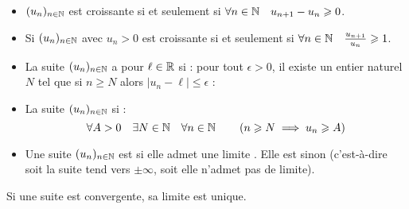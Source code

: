 \documentclass[10pt,class=article,crop=false]{standalone}
\begin{document}
\begin{multicols}{2}
\begin{remarque*}
	\sauteligne
	\begin{itemize}
		\item $(u_n)_{n\in \mathbb{N}}$ est croissante si et seulement si $\forall n\in \mathbb{N} \quad  u_{n+1}-u_n \geqslant 0$.
		\item Si $(u_n)_{n\in \mathbb{N}}$ avec $u_n>0$ est
		croissante si et seulement si $\forall n\in \mathbb{N} \quad \frac{u_{n+1}}{u_n} \geqslant 1$.
	\end{itemize}
\end{remarque*}



\begin{definition}
\begin{itemize}
	\item 
	La suite $(u_n)_{n\in \mathbb{N}}$ a pour  $\ell\in \mathbb{R}$ si :
	pour tout $\epsilon >0$, il existe un entier naturel $N$ tel que si $n\geq N$ alors
	$\lvert u_n-\ell\rvert\leq\epsilon$ :
	
	\item La suite $(u_n)_{n\in \mathbb{N}}$  si :
	\[ \forall A >0 \quad \exists N \in \mathbb{N} \quad
	\forall n \in \mathbb{N} \qquad \left( n\geqslant N \implies u_n\geqslant A \right)\]
	
	\item 	Une suite $(u_n)_{n\in \mathbb{N}}$ est  si elle admet une limite .
	Elle est  sinon (c'est-à-dire soit la suite tend vers $\pm \infty$,
	soit elle n'admet pas de limite).
\end{itemize}
\end{definition}

\begin{proposition}
	Si une suite est convergente, sa limite est unique.
\end{proposition}





\end{multicols}
\end{document}
